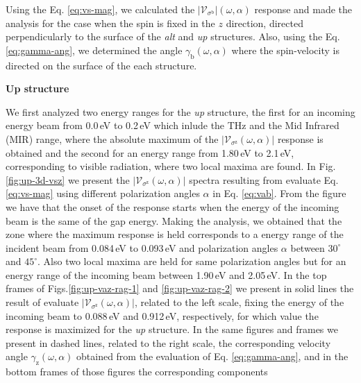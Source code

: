 \documentclass[prb,11pt,tightenlines,twocolumn,aps]{revtex4-1}
\begin{document}

Using the Eq. \eqref{eq:vs-mag}, we calculated the
$|\mathcal{V}_{\sigma^{\mathrm{b}}}|(\omega,\alpha)$ response and made the
analysis for the case when the spin is fixed in the $z$ direction, directed
perpendicularly to the surface of the \emph{alt} and \emph{up} structures. Also,
using the Eq. \eqref{eq:gamma-ang}, we determined the angle
$\gamma_{\mathrm{b}}(\omega,\alpha)$ where the spin-velocity is directed on the
surface of the each structure.

\textbf{Up structure}

We first analyzed two energy ranges for the \emph{up} structure, the first for
an incoming energy beam from 0.0\,eV to 0.2\,eV which inlude the THz and the Mid
Infrared (MIR) range, where the absolute maximum of the
$|\mathcal{V}_{\sigma^{\mathrm{z}}}(\omega,\alpha)|$ response is obtained and
the second for an energy range from 1.80\,eV to 2.1\,eV, corresponding to
visible radiation, where two local maxima are found.
% 
In Fig. \ref{fig:up-3d-vsz} we present the
$|\mathcal{V}_{\sigma^{\mathrm{z}}}(\omega,\alpha)|$ spectra resulting from
evaluate Eq. \eqref{eq:vs-mag} using different polarization angles $\alpha$ in
Eq. \eqref{eq:vab}. From the figure we have that the onset of the response
starts when the energy of the incoming beam is the same of the gap energy.
% 
Making the analysis, we obtained that the zone where the maximum response is
held corresponds to a energy range of the incident beam from 0.084\,eV to
0.093\,eV and polarization angles $\alpha$ between $30^{\circ}$ and
$45^{\circ}$. Also two local maxima are held for same polarization angles but
for an energy range of the incoming beam between 1.90\,eV and 2.05\,eV.
In the top frames of Figs.\ref{fig:up-vaz-rag-1} and \ref{fig:up-vaz-rag-2} we
present in solid lines the result of evaluate
$|\mathcal{V}_{\sigma^{\mathrm{z}}}(\omega,\alpha)|$, related to the left scale,
fixing the energy of the incoming beam to 0.088\,eV and 0.912\,eV, respectively,
for which value the response is maximized for the \emph{up} structure. In the
same figures and frames we present in dashed lines, related to the right scale,
the corresponding velocity angle $\gamma_{\mathrm{z}}(\omega,\alpha)$ obtained
from the evaluation of Eq. \eqref{eq:gamma-ang}, and in the bottom frames of
those figures the corresponding components
\end{document}
